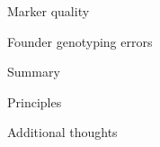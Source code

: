 \documentclass[aspectratio=169,12pt,t]{beamer}
\begin{document}



\begin{frame}[c]{}

\centerline{\Large \color{title} Marker quality}

\note{
}

\end{frame}










\begin{frame}[c]{}

\centerline{\Large \color{title} Founder genotyping errors}

\note{
}

\end{frame}





\begin{frame}[c]{Summary}

\note{
}

\end{frame}



\begin{frame}[c]{Principles}

\note{
}

\end{frame}



\begin{frame}[c]{Additional thoughts}

\note{
}

\end{frame}
\end{document}
